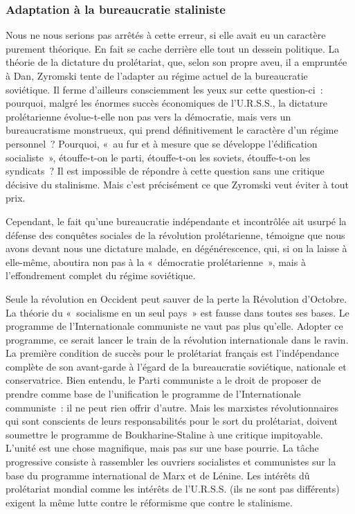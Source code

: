 \documentclass[french,twoside]{book} %
\begin{document}
\subsubsection[{Adaptation à la bureaucratie staliniste}]{Adaptation à la bureaucratie staliniste}
\noindent Nous ne nous serions pas arrêtés à cette erreur, si elle avait eu un caractère purement théorique. En fait se cache derrière elle tout un dessein politique. La théorie de la dictature du prolétariat, que, selon son propre aveu, il a empruntée à Dan, Zyromski tente de l’adapter au régime actuel de la bureaucratie soviétique. Il ferme d’ailleurs consciemment les yeux sur cette question-ci : pourquoi, malgré les énormes succès économiques de l’U.R.S.S., la dictature prolétarienne évolue-t-elle non pas vers la démocratie, mais vers un bureaucratisme monstrueux, qui prend définitivement le caractère d’un régime personnel ? Pourquoi, « au fur et à mesure que se développe l’édification socialiste », étouffe-t-on le parti, étouffe-t-on les soviets, étouffe-t-on les syndicats ? Il est impossible de  répondre à cette question sans une critique décisive du stalinisme. Mais c’est précisément ce que Zyromski veut éviter à tout prix.\par
Cependant, le fait qu’une bureaucratie indépendante et incontrôlée ait usurpé la défense des conquêtes sociales de la révolution prolétarienne, témoigne que nous avons devant nous une dictature malade, en dégénérescence, qui, si on la laisse à elle-même, aboutira non pas à la « démocratie prolétarienne », mais à l’effondrement complet du régime soviétique.\par
Seule la révolution en Occident peut sauver de la perte la Révolution d’Octobre. La théorie du « socialisme en un seul pays » est fausse dans toutes ses bases. Le programme de l’Internationale communiste ne vaut pas plus qu’elle. Adopter ce programme, ce serait lancer le train de la révolution internationale dans le ravin. La première condition de succès pour le prolétariat français est l’indépendance complète de son avant-garde à l’égard de la bureaucratie soviétique, nationale et conservatrice. Bien entendu, le Parti communiste a le droit de proposer de prendre comme base de l’unification le programme de l’Internationale communiste : il ne peut rien offrir d’autre. Mais les marxistes révolutionnaires qui sont conscients de leurs responsabilités pour le sort du prolétariat, doivent soumettre le programme de Boukharine-Staline à une critique impitoyable. L’unité est une chose magnifique, mais pas sur une base pourrie. La tâche progressive consiste à rassembler les ouvriers socialistes et communistes sur la base du programme international de Marx et de Lénine. Les intérêts dû prolétariat mondial comme les intérêts de l’U.R.S.S. (ils ne sont pas différents) exigent la même lutte contre le réformisme que contre le stalinisme.
\end{document}
